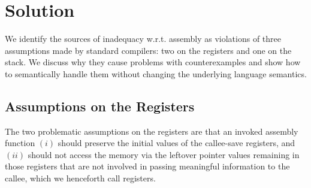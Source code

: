 \section{Solution}
\label{sec:compiler:solution}

We identify the sources of inadequacy w.r.t. assembly as violations of
three assumptions made by standard compilers: two on the registers and one on the stack.
We discuss why they 
cause problems with counterexamples and show how to semantically
handle them without changing the underlying language semantics.

\subsection{Assumptions on the Registers}
\label{sec:overview-semantics-register}
%
The two problematic assumptions on the registers are that
an invoked assembly function $(i)$ should
preserve the initial values of the callee-save registers, and $(ii)$
should not access the memory via the leftover pointer values remaining
in those registers that are not involved in passing meaningful information to the callee,
which we henceforth call \emph{\nip{}} registers.

